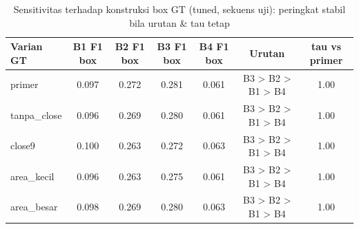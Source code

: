 \begin{table}[t]
\centering
\caption{Sensitivitas terhadap konstruksi box GT (tuned, sekuens uji): peringkat stabil bila urutan \& tau tetap}
\label{tab:table_gt_sensitivity}
\begin{tabular}{lcccccc}
\toprule
Varian GT & B1 F1 box & B2 F1 box & B3 F1 box & B4 F1 box & Urutan & tau vs primer \\
\midrule
primer & 0.097 & 0.272 & 0.281 & 0.061 & B3 > B2 > B1 > B4 & 1.00 \\
tanpa\_close & 0.096 & 0.269 & 0.280 & 0.061 & B3 > B2 > B1 > B4 & 1.00 \\
close9 & 0.100 & 0.263 & 0.272 & 0.063 & B3 > B2 > B1 > B4 & 1.00 \\
area\_kecil & 0.096 & 0.263 & 0.275 & 0.061 & B3 > B2 > B1 > B4 & 1.00 \\
area\_besar & 0.098 & 0.269 & 0.280 & 0.063 & B3 > B2 > B1 > B4 & 1.00 \\
\bottomrule
\end{tabular}
\end{table}
